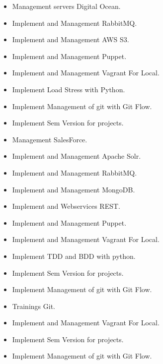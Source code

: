 \documentclass[10pt,a4paper]{altacv}
\begin{document}
\divider

\begin{itemize}
  \item Management servers Digital Ocean.
  \item Implement and Management RabbitMQ.
  \item Implement and Management AWS S3.
  \item Implement and Management Puppet.
  \item Implement and Management Vagrant For Local.
  \item Implement Load Stress with Python.
  \item Implement Management of git with Git Flow.
  \item Implement Sem Version for projects.
  \item Management SalesForce.
\end{itemize}

\divider

\begin{itemize}
  \item Implement and Management Apache Solr.
  \item Implement and Management RabbitMQ.
  \item Implement and Management MongoDB.
  \item Implement and Webservices REST.
  \item Implement and Management Puppet.
  \item Implement and Management Vagrant For Local.
  \item Implement TDD and BDD with python.
  \item Implement Sem Version for projects.
  \item Implement Management of git with Git Flow.
\end{itemize}
\divider

\begin{itemize}
  \item Trainings Git.
  \item Implement and Management Vagrant For Local.
  \item Implement Sem Version for projects.
  \item Implement Management of git with Git Flow.
\end{itemize}
\end{document}
